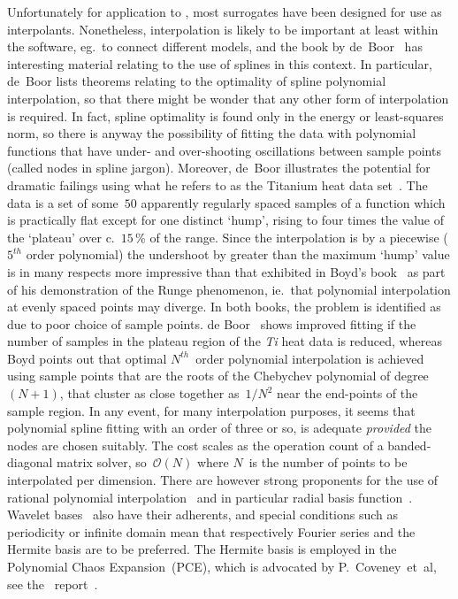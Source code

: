 Unfortunately for application to \nep, most surrogates have been designed for use as
interpolants. Nonetheless, interpolation is likely to be important at least within the software,
eg.\ to connect different models, and the book by de~Boor~\cite{deboor} has interesting
material relating to the use of splines in this context. In particular, de~Boor lists
theorems relating to the optimality of spline polynomial interpolation, so that there might be
wonder that any other form of interpolation is required. In fact, spline optimality is found only in 
the energy or least-squares norm, so there is anyway the possibility of fitting the data
with polynomial functions that have under- and over-shooting oscillations between sample
points (called nodes in spline jargon). Moreover, de~Boor illustrates the potential for dramatic failings
using what he refers to as the Titanium heat data set~\cite[Fig.\ XIII.1]{deboor}. The data is
a set of some~$50$ apparently regularly spaced samples of a function which is practically
flat except for one distinct `hump', rising to four times the value of the `plateau' over
c.\ $15$\,\% of the range. Since the interpolation is by a piecewise  ($5^{th}$ order polynomial)
the undershoot by greater than the maximum `hump' value is in many respects more impressive than
that exhibited in Boyd's book~\cite[Fig.\ 4.3]{boyd} as part of his demonstration of the Runge
phenomenon, ie.\ that polynomial interpolation at evenly spaced points may diverge. In both books,
the problem is identified as due to poor choice of sample points. de Boor~\cite[Fig.\ XIV.5]{deboor}
shows improved fitting if the number of samples in the plateau region of the \emph{Ti} heat data is reduced,
whereas Boyd points out that optimal $N^{th}$~order polynomial interpolation is achieved using
sample points that are the roots of the Chebychev
polynomial of degree~$(N+1)$, that cluster as close together as~$1/N^2$ near the end-points
of the sample region. In any event, for many interpolation purposes, it seems that polynomial spline
fitting with an order of three or so, is adequate \emph{provided} the nodes are chosen suitably. The cost
scales as the operation count  of a banded-diagonal matrix solver, so~$\mathcal{O}(N)$ where $N$~is the
number of points to be interpolated per dimension.
There are however strong proponents for the use of rational polynomial interpolation~\cite{stoerbulirsch}
and in particular radial basis function~\cite{fornbergflyer}. Wavelet bases~\cite{Fa15Wave} also
have their adherents, and special conditions such as periodicity or infinite domain mean that
respectively Fourier series and the Hermite basis are to be preferred. The Hermite basis is
employed in the Polynomial Chaos Expansion~(PCE), which is advocated by P.\ Coveney~et~al, see
the \nep\ report~\cite{2047352_1-TN-01}. %

